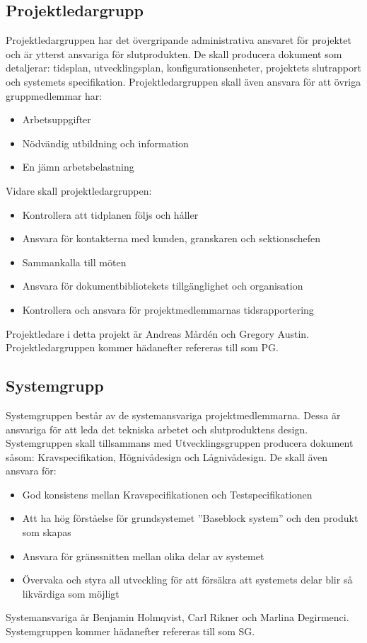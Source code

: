 \documentclass[paper=a4, fontsize=11pt,twoside]{article}
\begin{document}
\subsection*{Projektledargrupp}
Projektledargruppen har det övergripande administrativa ansvaret för projektet och är ytterst ansvariga för slutprodukten. De skall producera dokument som detaljerar: tidsplan, utvecklingsplan, konfigurationsenheter, projektets slutrapport och systemets specifikation.
Projektledargruppen skall även ansvara för att övriga gruppmedlemmar har:
\begin{itemize}
\item Arbetsuppgifter
\item Nödvändig utbildning och  information
\item En jämn arbetsbelastning
\end{itemize}
Vidare skall projektledargruppen:	
\begin{itemize}	 
\item Kontrollera att tidplanen följs och håller
\item Ansvara för kontakterna med kunden, granskaren och sektionschefen
\item Sammankalla till möten
\item Ansvara för dokumentbibliotekets tillgänglighet och organisation
\item Kontrollera och ansvara för projektmedlemmarnas tidsrapportering
\end{itemize}
Projektledare i detta projekt är Andreas Mårdén och Gregory Austin.	
Projektledargruppen kommer hädanefter refereras till som PG.


\subsection*{Systemgrupp}
Systemgruppen består av de systemansvariga projektmedlemmarna. Dessa är ansvariga för att leda det tekniska arbetet och slutproduktens design. Systemgruppen skall tillsammans med Utvecklingsgruppen producera dokument såsom: Kravspecifikation, Högnivådesign och Lågnivådesign. 
De skall även ansvara för: 
\begin{itemize}
\item God konsistens mellan Kravspecifikationen och Testspecifikationen 
\item Att ha hög förståelse för grundsystemet ''Baseblock system'' och den produkt som skapas	 
\item Ansvara för gränssnitten mellan olika delar av systemet
\item Övervaka och styra all utveckling för att försäkra att systemets delar blir så likvärdiga som möjligt
\end{itemize}
Systemansvariga är Benjamin Holmqvist, Carl Rikner och Marlina Degirmenci. 
Systemgruppen kommer hädanefter refereras till som SG.
\end{document}
